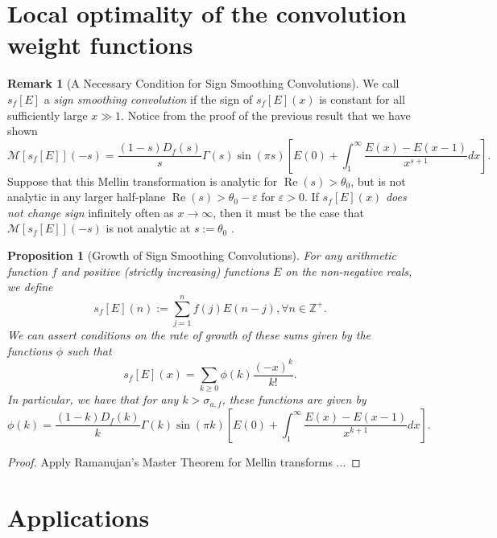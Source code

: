 \documentclass[11pt,reqno]{amsart}
\numberwithin{figure}{section}
\numberwithin{table}{section}
\let\citep\cite
\newcommand{\cf}{\textit{cf.\ }}
\newcommand{\floor}[1]{\left\lfloor #1 \right\rfloor}
\renewcommand{\Re}{\operatorname{Re}}
\theoremstyle{plain}
\newtheorem{prop}[theorem]{Proposition}
\numberwithin{theorem}{section}
\theoremstyle{definition}
\newtheorem{remark}[theorem]{Remark}
\begin{document}
\section{Local optimality of the convolution weight functions} 


\begin{remark}[A Necessary Condition for Sign Smoothing Convolutions] 
We call $s_f[E]$ a \emph{sign smoothing convolution} if the sign of $s_f[E](x)$ is 
constant for all sufficiently large $x \gg 1$. 
Notice from the proof of the previous result that we have shown
\[
\mathcal{M}[s_f[E]](-s) = \frac{(1-s) D_f(s)}{s} \Gamma(s) \sin(\pi s) \left[ 
     E(0) + \int_1^{\infty} \frac{E(x)-E(x-1)}{x^{s+1}} dx 
     \right]. 
\]
Suppose that this Mellin transformation is analytic for $\Re(s) > \theta_0$, but is not 
analytic in any larger half-plane $\Re(s) > \theta_0-\varepsilon$ for $\varepsilon>0$. 
If $s_f[E](x)$ \emph{does not change sign} 
infinitely often as $x \rightarrow \infty$, then it must 
be the case that $\mathcal{M}[s_f[E]](-s)$ is not analytic at $s := \theta_0$ 
\citep[\cf Landau's Theorem]{OSCPROPS-ARITHFUNCSI}. 
\end{remark} 

\begin{prop}[Growth of Sign Smoothing Convolutions]
For any arithmetic function $f$ and positive (strictly increasing) functions $E$ on the non-negative reals, 
we define 
\[
s_f[E](n) := \sum_{j=1}^{n} f(j) E(n-j), \forall n \in \mathbb{Z}^{+}. 
\] 
We can assert conditions on the rate of growth of these sums given by the functions $\phi$ such 
that $$s_f[E](x) = \sum_{k \geq 0} \phi(k) \frac{(-x)^{k}}{k!}.$$ In particular, we have that 
for any $k > \sigma_{a,f}$, these functions are given by 
\[
\phi(k) = \frac{(1-k) D_f(k)}{k} \Gamma(k) \sin(\pi k) \left[ 
     E(0) + \int_1^{\infty} \frac{E(x)-E(x-1)}{x^{k+1}} dx 
     \right]. 
\] 
\end{prop} 
\begin{proof} 
Apply Ramanujan's Master Theorem for Mellin transforms ... 
\end{proof} 




\section{Applications} 
\end{document}
